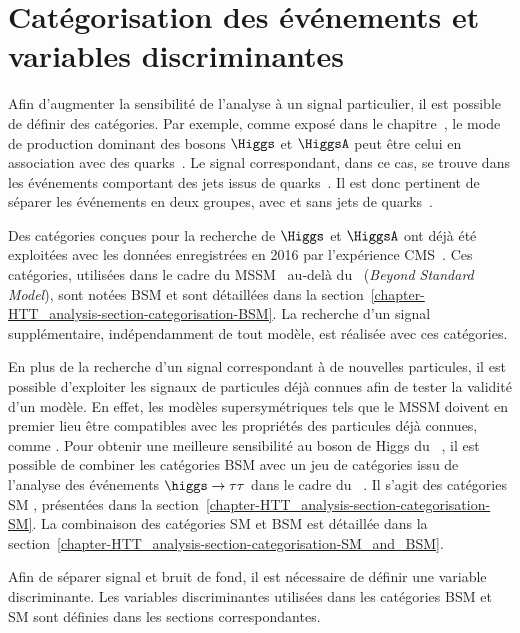 \section{Catégorisation des événements et variables discriminantes}\label{chapter-HTT_analysis-section-categorisation}
Afin d'augmenter la sensibilité de l'analyse à un signal particulier, il est possible de définir des catégories.
Par exemple, comme exposé dans le chapitre~, le mode de production dominant des bosons $\Higgs$ et $\HiggsA$ peut être celui en association avec des quarks~\quarkb.
Le signal correspondant, dans ce cas, se trouve dans les événements comportant des jets issus de quarks~\quarkb.
Il est donc pertinent de séparer les événements en deux groupes, avec et sans jets de quarks~\quarkb.
\par
Des catégories conçues pour la recherche de $\Higgs$ et $\HiggsA$ ont déjà été exploitées avec les données enregistrées en 2016 par l'expérience CMS~\cite{CMS-PAS-HIG-17-020}.
Ces catégories, utilisées dans le cadre du MSSM \ie\ au-delà du \SM\ (\emph{Beyond Standard Model}), sont notées \og BSM \fg{} et sont détaillées dans la section~\ref{chapter-HTT_analysis-section-categorisation-BSM}.
La recherche d'un signal supplémentaire, indépendamment de tout modèle, est réalisée avec ces catégories.
\par
En plus de la recherche d'un signal correspondant à de nouvelles particules, il est possible d'exploiter les signaux de particules déjà connues afin de tester la validité d'un modèle.
En effet, les modèles supersymétriques tels que le MSSM doivent en premier lieu être compatibles avec les propriétés des particules déjà connues, comme \higgs.
Pour obtenir une meilleure sensibilité au boson de Higgs du \SM\ \higgs, il est possible de combiner les catégories BSM avec un jeu de catégories issu de l'analyse des événements $\higgs\to\tau\tau$ dans le cadre du \SM~\cite{CMS-PAS-HIG-19-010,CMS-NOTE-2019-177,CMS-NOTE-2019-178}.
Il s'agit des catégories \og SM \fg, présentées dans la section~\ref{chapter-HTT_analysis-section-categorisation-SM}.
La combinaison des catégories SM et BSM est détaillée dans la section~\ref{chapter-HTT_analysis-section-categorisation-SM_and_BSM}.
\par
Afin de séparer signal et bruit de fond, il est nécessaire de définir une variable discriminante.
Les variables discriminantes utilisées dans les catégories BSM et SM sont définies dans les sections correspondantes.



